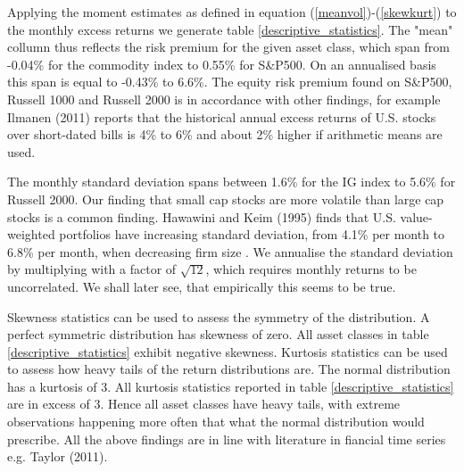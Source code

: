 \documentclass[11pt,a4paper,oneside]{article}
\begin{document}
\noindent Applying the moment estimates as defined in equation (\ref{meanvol})-(\ref{skewkurt}) to the monthly excess returns we generate table \ref{descriptive_statistics}. The "mean" collumn thus reflects the risk premium for the given asset class, which span from -0.04\% for the commodity index to 0.55\% for S\&P500. On an annualised basis this span is equal to -0.43\% to 6.6\%. The equity risk premium found on S\&P500, Russell 1000 and Russell 2000 is in accordance with other findings, for example Ilmanen (2011) reports that the historical annual excess returns of U.S. stocks over short-dated bills is 4\% to 6\% and about 2\% higher if arithmetic means are used\cite{ilmanen}.

The monthly standard deviation spans between 1.6\% for the IG index to 5.6\% for Russell 2000. Our finding that small cap stocks are more volatile than large cap stocks is a common finding. Hawawini and Keim (1995) finds that U.S. value-weighted portfolios have increasing standard deviation, from 4.1\% per month to 6.8\% per month, when decreasing firm size \cite{Hawawin}. We annualise the standard deviation by multiplying with a factor of $\sqrt{12}$, which requires monthly returns to be uncorrelated. We shall later see, that empirically this seems to be true. 

Skewness statistics can be used to assess the symmetry of the distribution. A perfect symmetric distribution has skewness of zero. All asset classes in table \ref{descriptive_statistics} exhibit negative skewness. Kurtosis statistics can be used to assess how heavy tails of the return distributions are. The normal distribution has a kurtosis of 3. All kurtosis statistics reported in table \ref{descriptive_statistics} are in excess of 3. Hence all asset classes have heavy tails, with extreme observations happening more often that what the normal distribution would prescribe. All the above findings are in line with literature in fiancial time series e.g. Taylor (2011)\cite{Taylor}.           
\end{document}
